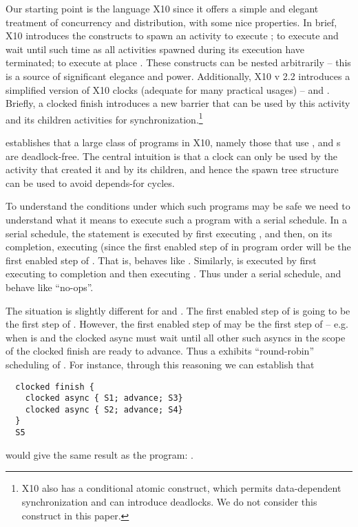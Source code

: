 Our starting point is the language X10 \cite{x10} since it offers a
simple and elegant treatment of concurrency and distribution, with
some nice properties.  In brief, X10
introduces the constructs  to spawn an activity to
execute ;  to execute  and wait until
such time as all activities spawned during its execution have
terminated;  to execute  at place
. These constructs can be nested arbitrarily -- this is a
source of significant elegance and power. Additionally, X10 v 2.2
introduces a simplified version of X10 clocks (adequate for many
practical usages) --  and . Briefly, a clocked finish introduces a new barrier that can be
used by this activity and its children activities for
synchronization.\footnote{X10 also has a conditional atomic construct,
   which permits data-dependent synchronization and
  can introduce deadlocks. We do not consider this construct in this paper.}

\cite{vj-clock} establishes that a large class of programs
in X10, namely those that use ,  and
s are deadlock-free. The central intuition is that a clock
can only be used by the activity that created it and by its children,
and hence the spawn tree structure can be used to avoid depends-for
cycles.

To understand the conditions under which such programs may be safe we
need to understand what it means to execute such a program with a
serial schedule. In a serial schedule, the statement  is executed by first executing , and then, on
its completion, executing  (since the first enabled step of
 in program order will be the first enabled step
of .  That is,  behaves like
. Similarly,  is executed by first
executing  to completion and then executing . Thus
under a serial schedule,  and  behave like
``no-ops''.

The situation is slightly different for  and
. The first enabled step of  is going to be the first step of . However, the
first enabled step of  may be the first
step of  -- e.g.{} when  is  and
the clocked async must wait until all other such asyncs in the scope
of the clocked finish are ready to advance. Thus a  exhibits ``round-robin'' scheduling of . For
instance, through this reasoning we can establish that
\begin{lstlisting}
  clocked finish {
    clocked async { S1; advance; S3}
    clocked async { S2; advance; S4}
  }
  S5
\end{lstlisting}
would give the same result as the program: .

